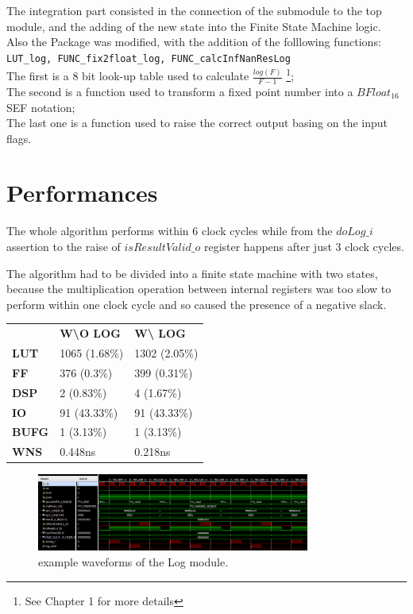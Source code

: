 \documentclass{report}
\begin{document}
The integration part consisted in the connection of the submodule to the top module, and the adding of the new state into the Finite State Machine logic.\\
Also the Package was modified, with the addition of the folllowing functions:\\
\colorbox{mygray}{\lstinline!LUT_log, FUNC_fix2float_log, FUNC_calcInfNanResLog! }
\\The first is a 8 bit look-up table used to calculate $\frac{log(F)}{F-1}$ \footnote{See Chapter 1 for more details};
\\The second is a function used to transform a fixed point number into a $BFloat_{16}$ SEF notation;
\\The last one is a function used to raise the correct output basing on the input flags. 

\bigskip
\section{Performances}

The whole algorithm performs within 6 clock cycles while from the $doLog\_i$ assertion to the raise of $isResultValid\_o$ register happens after just 3 clock cycles.

The algorithm had to be divided into a finite state machine with two states, because the multiplication operation between internal registers was too slow to perform within one clock cycle and so caused the presence of a negative slack.

\begin{table}[htbp]
\centering
\begin{tabular}{lll}
              & \textbf{W\textbackslash{}O LOG} & \textbf{W\textbackslash{} LOG}  \\
\textbf{LUT}  & 1065 (1.68\%)          & 1302 (2.05\%)             \\
\textbf{FF}   & 376 (0.3\%)			   & 399 (0.31\%)               \\
\textbf{DSP}  & 2 (0.83\%)             & 4 (1.67\%)             \\
\textbf{IO}   & 91 (43.33\%)           & 91 (43.33\%)           \\
\textbf{BUFG} & 1 (3.13\%)             & 1 (3.13\%)             \\
\textbf{WNS}  & 0.448ns                & 0.218ns                 
\end{tabular}
\end{table}


\begin{figure}[h]
  \centering
    \includegraphics[width=0.8\textwidth]{images/waveforms.png}
    \caption{example waveforms of the Log module.}
\end{figure}
\end{document}
